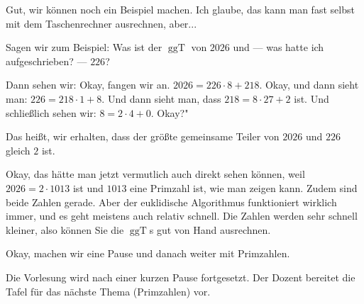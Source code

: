 \begin{spoken-clean}[00:38:39 - 00:40:35]
Gut, wir können noch ein Beispiel machen. Ich glaube, das kann man fast selbst mit dem Taschenrechner ausrechnen, aber...

Sagen wir zum Beispiel: Was ist der $\operatorname{ggT}$ von $2026$ und --- was hatte ich aufgeschrieben? --- $226$?

Dann sehen wir: Okay, fangen wir an. $2026 = 226 \cdot 8 + 218$. Okay, und dann sieht man: $226 = 218 \cdot 1 + 8$. Und dann sieht man, dass $218 = 8 \cdot 27 + 2$ ist. Und schließlich sehen wir: $8 = 2 \cdot 4 + 0$. Okay?"

Das heißt, wir erhalten, dass der größte gemeinsame Teiler von $2026$ und $226$ gleich $2$ ist.

Okay, das hätte man jetzt vermutlich auch direkt sehen können, weil $2026 = 2 \cdot 1013$ ist und $1013$ eine Primzahl ist, wie man zeigen kann. Zudem sind beide Zahlen gerade. Aber der euklidische Algorithmus funktioniert wirklich immer, und es geht meistens auch relativ schnell. Die Zahlen werden sehr schnell kleiner, also können Sie die $\operatorname{ggT}$s gut von Hand ausrechnen.
\end{spoken-clean}

\begin{math-stroke}
\end{math-stroke}

\begin{spoken-clean}[00:40:35 - 00:40:39]
Okay, machen wir eine Pause und danach weiter mit Primzahlen.
\end{spoken-clean}

\begin{lecture-break}
Die Vorlesung wird nach einer kurzen Pause fortgesetzt. Der Dozent bereitet die Tafel für das nächste Thema (Primzahlen) vor.
\end{lecture-break}

